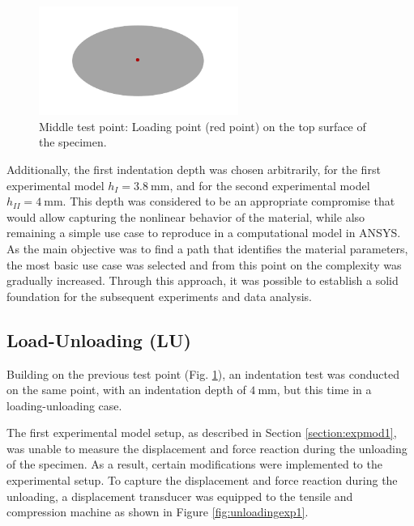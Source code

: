 \begin{figure}%
    \centering
   \quad
   \includegraphics[width=6.5cm]{Images/Experiment/specimenmidp.png}%
   \caption[Middle point test position]{Middle test point: Loading point (red point) on the top surface of the specimen.}%
   \label{fig:midpoint}%
\end{figure}

Additionally, the first indentation depth was chosen arbitrarily, for the first 
experimental model $h_{I} = \SI{3.8}{\milli \m}$, and for the second 
experimental model $h_{II} = \SI{4}{\milli \m}$. This depth was considered 
to be an appropriate compromise that would allow capturing the nonlinear 
behavior of the material, while also remaining a simple use case to 
reproduce in a computational model in ANSYS.\\

As the main objective was to find a path that identifies the material 
parameters, the most basic use case was selected and from this point on
the complexity was gradually increased. Through this approach, it was possible 
to establish a solid foundation for the subsequent experiments and data analysis.


\subsection*{Load-Unloading (LU)}
\label{subsection:loadunload}
Building on the previous test point (Fig. \ref{fig:midpoint}), an indentation
test was conducted on the same point, with an indentation depth of 
$\SI{4}{\milli \m}$, but this time in a loading-unloading case.

The first experimental model setup, as described in Section \ref{section:expmod1},
was unable to measure the displacement and force reaction during the unloading 
of the specimen. As a result, certain modifications were implemented to the experimental 
setup. 
To capture the displacement and force reaction during the unloading, a 
displacement transducer was equipped to the tensile and compression machine 
as shown in Figure \ref{fig:unloadingexp1}.

